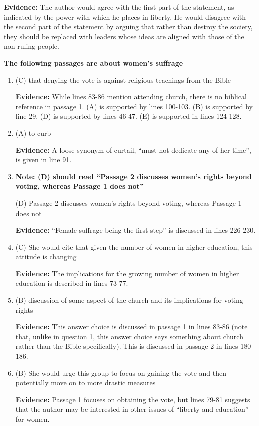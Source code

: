 \begin{enumerate}
\begin{enumerate}
\textbf{Evidence:} The author would agree with the first part of the statement, as indicated by the power with which he places in liberty. He would disagree with the second part of the statement by arguing that rather than destroy the society, they should be replaced with leaders whose ideas are aligned with those of the non-ruling people. 
\end{enumerate}

\textbf{The following passages are about women's suffrage}

\begin{enumerate}
\item (C) that denying the vote is against religious teachings from the Bible

\textbf{Evidence:} While lines 83-86 mention attending church, there is no biblical reference in passage 1. (A) is supported by lines 100-103. (B) is supported by line 29. (D) is supported by lines 46-47. (E) is supported in lines 124-128. 

\bigskip
\item (A) to curb

\textbf{Evidence:} A loose synonym of curtail, ``must not dedicate any of her time'', is given in line 91. 

\bigskip
\item \textbf{Note: (D) should read ``Passage 2 discusses women's rights beyond voting, whereas Passage 1 does not''}

(D) Passage 2 discusses women's rights beyond voting, whereas Passage 1 does not

\textbf{Evidence:} ``Female suffrage being the first step'' is discussed in lines 226-230. 

\bigskip
\item (C) She would cite that given the number of women in higher education, this attitude is changing

\textbf{Evidence:} The implications for the growing number of women in higher education is described in lines 73-77.

\bigskip
\item (B) discussion of some aspect of the church and its implications for voting
rights

\textbf{Evidence:} This answer choice is discussed in passage 1 in lines 83-86 (note that, unlike in question 1, this answer choice says something about church rather than the Bible specifically). This is discussed in passage 2 in lines 180-186.

\bigskip
\item (B) She would urge this group to focus on gaining the vote and then potentially move on to more drastic measures

\textbf{Evidence:} Passage 1 focuses on obtaining the vote, but lines 79-81 suggests that the author may be interested in other issues of ``liberty and education'' for women. 
\end{enumerate}
\end{enumerate}